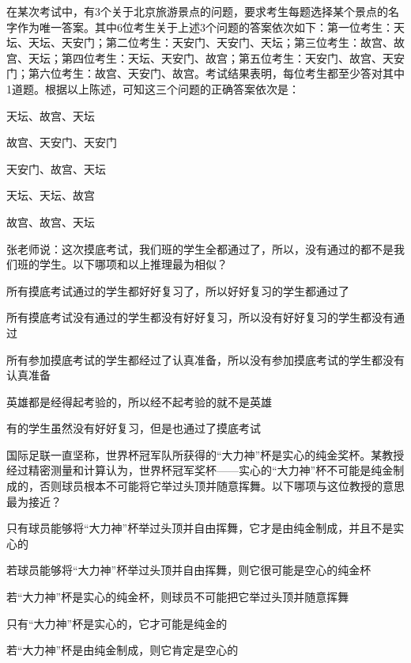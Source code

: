 \documentclass{exam-zh}
\begin{document}
\begin{question}
  在某次考试中，有3个关于北京旅游景点的问题，要求考生每题选择某个景点的名字作为唯一答案。其中6位考生关于上述3个问题的答案依次如下：第一位考生：天坛、天坛、天安门；第二位考生：天安门、天安门、天坛；第三位考生：故宫、故宫、天坛；第四位考生：天坛、天安门、故宫；第五位考生：天安门、故宫、天安门；第六位考生：故宫、天安门、故宫。考试结果表明，每位考生都至少答对其中1道题。根据以上陈述，可知这三个问题的正确答案依次是：
  \paren

  \begin{choices}
    \item 天坛、故宫、天坛
    \item 故宫、天安门、天安门
    \item 天安门、故宫、天坛
    \item 天坛、天坛、故宫
    \item 故宫、故宫、天坛
  \end{choices}
\end{question}

\begin{question}
  张老师说：这次摸底考试，我们班的学生全都通过了，所以，没有通过的都不是我们班的学生。以下哪项和以上推理最为相似？
  \paren

  \begin{choices}
    \item 所有摸底考试通过的学生都好好复习了，所以好好复习的学生都通过了
    \item 所有摸底考试没有通过的学生都没有好好复习，所以没有好好复习的学生都没有通过
    \item 所有参加摸底考试的学生都经过了认真准备，所以没有参加摸底考试的学生都没有认真准备
    \item 英雄都是经得起考验的，所以经不起考验的就不是英雄
    \item 有的学生虽然没有好好复习，但是也通过了摸底考试
  \end{choices}
\end{question}

\begin{question}
  国际足联一直坚称，世界杯冠军队所获得的“大力神”杯是实心的纯金奖杯。某教授经过精密测量和计算认为，世界杯冠军奖杯——实心的“大力神”杯不可能是纯金制成的，否则球员根本不可能将它举过头顶并随意挥舞。以下哪项与这位教授的意思最为接近？
  \paren

  \begin{choices}
    \item 只有球员能够将“大力神”杯举过头顶并自由挥舞，它才是由纯金制成，并且不是实心的
    \item 若球员能够将“大力神”杯举过头顶并自由挥舞，则它很可能是空心的纯金杯
    \item 若“大力神”杯是实心的纯金杯，则球员不可能把它举过头顶并随意挥舞
    \item 只有“大力神”杯是实心的，它才可能是纯金的
    \item 若“大力神”杯是由纯金制成，则它肯定是空心的
  \end{choices}
\end{question}
\end{document}
